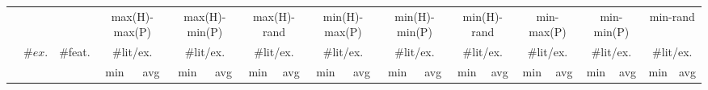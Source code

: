 \begin{tabular}{lccrrrrrrrrrrrrrrrrrr}
\toprule
& && \multicolumn{2}{c}{max(H)-max(P)} & \multicolumn{2}{c}{max(H)-min(P)} & \multicolumn{2}{c}{max(H)-rand} & \multicolumn{2}{c}{min(H)-max(P)} & \multicolumn{2}{c}{min(H)-min(P)} & \multicolumn{2}{c}{min(H)-rand} & \multicolumn{2}{c}{min-max(P)} & \multicolumn{2}{c}{min-min(P)} & \multicolumn{2}{c}{min-rand}\\
\cmidrule(rr){4-5}\cmidrule(rr){6-7}\cmidrule(rr){8-9}\cmidrule(rr){10-11}\cmidrule(rr){12-13}\cmidrule(rr){14-15}\cmidrule(rr){16-17}\cmidrule(rr){18-19}\cmidrule(rr){20-21}
&\multirow{2}{*}{$\#ex.$} & \multirow{2}{*}{\#feat.} &  \multicolumn{2}{c}{\#lit/ex.} & \multicolumn{2}{c}{\#lit/ex.} & \multicolumn{2}{c}{\#lit/ex.} & \multicolumn{2}{c}{\#lit/ex.} & \multicolumn{2}{c}{\#lit/ex.} & \multicolumn{2}{c}{\#lit/ex.} & \multicolumn{2}{c}{\#lit/ex.} & \multicolumn{2}{c}{\#lit/ex.} & \multicolumn{2}{c}{\#lit/ex.} \\\cmidrule(rl){4-5}\cmidrule(rl){6-7}\cmidrule(rl){8-9}\cmidrule(rl){10-11}\cmidrule(rl){12-13}\cmidrule(rl){14-15}\cmidrule(rl){16-17}\cmidrule(rl){18-19}\cmidrule(rl){20-21}
&& & \multicolumn{1}{c}{min} & \multicolumn{1}{c}{avg} & \multicolumn{1}{c}{min} & \multicolumn{1}{c}{avg} & \multicolumn{1}{c}{min} & \multicolumn{1}{c}{avg} & \multicolumn{1}{c}{min} & \multicolumn{1}{c}{avg} & \multicolumn{1}{c}{min} & \multicolumn{1}{c}{avg} & \multicolumn{1}{c}{min} & \multicolumn{1}{c}{avg} & \multicolumn{1}{c}{min} & \multicolumn{1}{c}{avg} & \multicolumn{1}{c}{min} & \multicolumn{1}{c}{avg} & \multicolumn{1}{c}{min} & \multicolumn{1}{c}{avg} \\
\midrule


\end{tabular}
